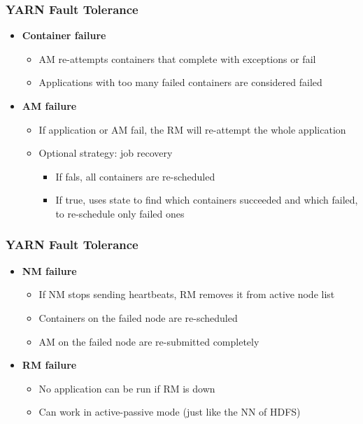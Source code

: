 \begin{frame}
\frametitle{YARN Fault Tolerance}
\begin{itemize}
  \item {\bf Container failure}
  \begin{itemize}
    \item AM re-attempts containers that complete with exceptions or fail
    \item Applications with too many failed containers are considered failed
  \end{itemize}
  \item {\bf AM failure}
  \begin{itemize}
    \item If application or AM fail, the RM will re-attempt the whole application
    \item Optional strategy: job recovery
    \begin{itemize}
      \item If fals, all containers are re-scheduled
      \item If true, uses state to find which containers succeeded and which failed, to re-schedule only failed ones
    \end{itemize}
  \end{itemize}
\end{itemize}
\end{frame}

\begin{frame}
\frametitle{YARN Fault Tolerance}
\begin{itemize}
  \item {\bf NM failure}
  \begin{itemize}
    \item If NM stops sending heartbeats, RM removes it from active node list
    \item Containers on the failed node are re-scheduled
    \item AM on the failed node are re-submitted completely
  \end{itemize}
  \item {\bf RM failure}
  \begin{itemize}
    \item No application can be run if RM is down
    \item Can work in active-passive mode (just like the NN of HDFS)
  \end{itemize}
\end{itemize}
\end{frame}

